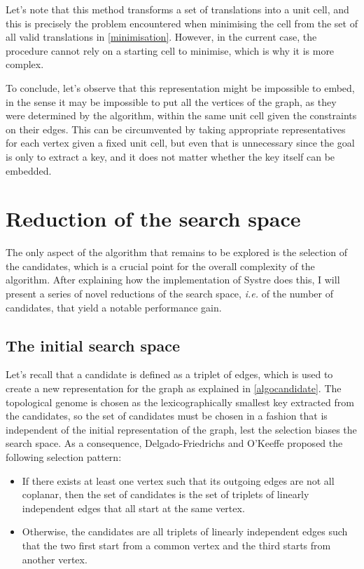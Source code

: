 \documentclass[main.tex]{subfiles}
\begin{document}
Let's note that this method transforms a set of translations into a unit cell, and this is precisely the problem encountered when minimising the cell from the set of all valid translations in \cref{minimisation}. However, in the current case, the procedure cannot rely on a starting cell to minimise, which is why it is more complex.

To conclude, let's observe that this representation might be impossible to embed, in the sense it may be impossible to put all the vertices of the graph, as they were determined by the algorithm, within the same unit cell given the constraints on their edges. This can be circumvented by taking appropriate representatives for each vertex given a fixed unit cell, but even that is unnecessary since the goal is only to extract a key, and it does not matter whether the key itself can be embedded.




\section{Reduction of the search space}

\label{searchspacereduction}

The only aspect of the algorithm that remains to be explored is the selection of the candidates, which is a crucial point for the overall complexity of the algorithm. After explaining how the implementation of Systre does this, I will present a series of novel reductions of the search space, \textit{i.e.} of the number of candidates, that yield a notable performance gain.

\subsection{The initial search space}

Let's recall that a candidate is defined as a triplet of edges, which is used to create a new representation for the graph as explained in \cref{algocandidate}. The topological genome is chosen as the lexicographically smallest key extracted from the candidates, so the set of candidates must be chosen in a fashion that is independent of the initial representation of the graph, lest the selection biases the search space. As a consequence, Delgado-Friedrichs and O'Keeffe \autocite{Systre} proposed the following selection pattern:
\begin{itemize}[noitemsep]
	\item If there exists at least one vertex such that its outgoing edges are not all coplanar, then the set of candidates is the set of triplets of linearly independent edges that all start at the same vertex.
	\item Otherwise, the candidates are all triplets of linearly independent edges such that the two first start from a common vertex and the third starts from another vertex.
\end{itemize}
\end{document}
